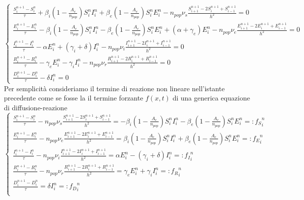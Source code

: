 \documentclass[11pt]{article}
\begin{document}
\begin{equation*}
\begin{cases}
\frac{S_i^{n+1} - S_i^n}{\tau} + \beta_i \left(1 - \frac{A_e}{n_{pop}} \right) S_i^n I_i^n + \beta_e \left(1 - \frac{A_e}{n_{pop}} \right) S_i^n E_i^n - n_{pop} \nu_s \frac{S_{i+1}^{n+1} - 2S_i^{n+1} + S_{i-1}^{n+1}}{h^2} = 0 \\
\frac{E_i^{n+1} - E_i^n}{\tau} - \beta_i \left(1 - \frac{A_e}{n_{pop}} \right) S_i^n I_i^n - \beta_e \left(1 - \frac{A_e}{n_{pop}} \right) S_i^n E_i^n + (\alpha + \gamma_e) E_i^n - n_{pop} \nu_e \frac{E_{i+1}^{n+1} - 2E_i^{n+1} + E_{i-1}^{n+1}}{h^2} = 0 \\
\frac{I_i^{n+1} - I_i^n}{\tau} - \alpha E_i^n + \left( \gamma_i + \delta \right) I_i^n - n_{pop} \nu_i \frac{I_{i+1}^{n+1} - 2I_i^{n+1} + I_{i-1}^{n+1}}{h^2} = 0 \\
\frac{R_i^{n+1} - R_i^n}{\tau} - \gamma_e E_i^n - \gamma_i I_i^n - n_{pop} \nu_r \frac{R_{i+1}^{n+1} - 2R_i^{n+1} + R_{i-1}^{n+1}}{h^2} = 0 \\
\frac{D_i^{n+1} - D_i^n}{\tau} - \delta I_i^n = 0
\end{cases}
\end{equation*}
Per semplicità consideriamo il termine di reazione non lineare nell'istante precedente come se fosse la il termine forzante \(f(x,t)\) di una generica equazione di diffusione-reazione 
\begin{equation*}
\begin{cases}
\frac{S_i^{n+1} - S_i^n}{\tau} - n_{pop} \nu_s \frac{S_{i+1}^{n+1} - 2S_i^{n+1} + S_{i-1}^{n+1}}{h^2} = - \beta_i \left(1 - \frac{A_e}{n_{pop}} \right) S_i^n I_i^n - \beta_e \left(1 - \frac{A_e}{n_{pop}} \right) S_i^n E_i^n = :{f_S}_i^n \\

\frac{E_i^{n+1} - E_i^n}{\tau} - n_{pop} \nu_e \frac{E_{i+1}^{n+1} - 2E_i^{n+1} + E_{i-1}^{n+1}}{h^2} =  \beta_i \left(1 - \frac{A_e}{n_{pop}} \right) S_i^n I_i^n + \beta_e \left(1 - \frac{A_e}{n_{pop}} \right) S_i^n E_i^n = :{f_E}_i^n \\
\frac{I_i^{n+1} - I_i^n}{\tau}  - n_{pop} \nu_i \frac{I_{i+1}^{n+1} - 2I_i^{n+1} + I_{i-1}^{n+1}}{h^2} =  \alpha E_i^n - \left( \gamma_i + \delta \right) I_i^n = :{f_I}_i^n \\
\frac{R_i^{n+1} - R_i^n}{\tau} - n_{pop} \nu_r \frac{R_{i+1}^{n+1} - 2R_i^{n+1} + R_{i-1}^{n+1}}{h^2} =  \gamma_e E_i^n + \gamma_i I_i^n = :{f_R}_i^n \\
\frac{D_i^{n+1} - D_i^n}{\tau} =  \delta I_i^n =:{f_D}_i^n \\
\end{cases}
\end{equation*}
\end{document}
